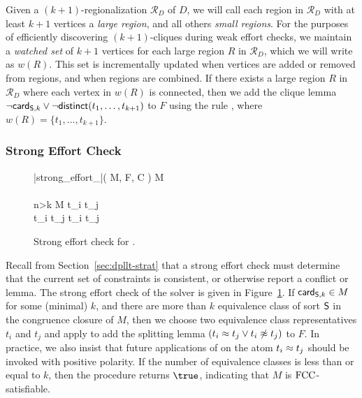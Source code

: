 \documentclass{svjour3}                     %
\begin{document}
Given a $(k+1)$-regionalization $\mathcal{R}_D$ of $D$,
we will call each region in $\mathcal{R}_D$ with at least $k+1$ vertices a \emph{large region}, and all others \emph{small regions}.
For the purposes of efficiently discovering $(k+1)$-cliques
during weak effort checks,
we maintain a \emph{watched set} of $k+1$ vertices for each large region $R$ in $\mathcal{R}_D$, which we will write as $w(R)$.
This set is incrementally updated when vertices are added or removed from regions, and when regions are combined. 
If there exists a large region $R$ in $\mathcal{R}_D$ where each vertex in $w(R)$ is connected,
then we add the clique lemma $\neg \card[\So,k] \vee \neg \distinct(t_1, \ldots, t_{k+1})$ to $F$ using the rule ,
where $w(R) = \{ t_1, \ldots, t_{k+1} \}$.

\subsubsection*{Strong Effort Check}

\begin{figure}[t]
\begin{program}
\PROC |strong\_effort\_\fcc|( M, F, C ) \BODY 
   \card[ \So, k ] \in M \\
   \\
  \IF n>k
     M \not\ent[\euf] t_i \tneq t_j \\
     t_i \teq t_j \vee t_i \tneq t_j \\
     
  \ELSE
     
\ENDPROC
\end{program}
\caption{
Strong effort check for \fcc.
}
\label{fig:fcc-dpllts-opt-strong-strategy}
\end{figure}

Recall from Section~\ref{sec:dpllt-strat} that a strong effort check 
must determine that the current set of constraints is consistent, or 
otherwise report a conflict or lemma.
The strong effort check of the \fcc solver is given in Figure~\ref{fig:fcc-dpllts-opt-strong-strategy}.
If $\card[ \So, k ] \in M$ for some (minimal) $k$, and 
there are more than $k$ equivalence class of sort $\So$ 
in the congruence closure of $M$,
then we choose two equivalence class representatives $t_i$ and $t_j$ and 
apply  to add the splitting lemma 
$( t_i \teq t_j \vee t_i \tneq t_j )$ to $F$.
In practice, we also insist that future applications of \decide on the atom $t_i \teq t_j$ should be invoked with positive polarity.
If the number of equivalence classes is less than or equal to $k$, then the procedure returns $\true$, indicating that $M$ is $\fcc$-satisfiable.
\end{document}
